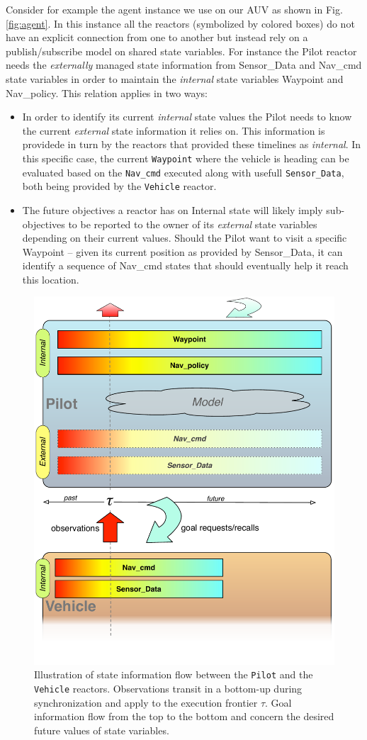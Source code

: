 Consider for example the \rx agent instance we use on our AUV as shown
in Fig. \ref{fig:agent}. In this instance all the reactors (symbolized
by colored boxes) do not have an explicit connection from one to
another but instead rely on a publish/subscribe model on shared state
variables. For instance the \textsf{Pilot} reactor needs the {\em
  externally} managed state information from \textsf{Sensor\_Data} and
\textsf{Nav\_cmd} state variables in order to maintain the
\emph{internal} state variables \textsf{Waypoint} and
\textsf{Nav\_policy}. This relation applies in two ways:

\begin{itemize}

\item In order to identify its current {\em internal} state values the
  \textsf{Pilot} needs to know the current {\em external} state 
  information it relies on. This information is providede in turn by
  the reactors that provided these timelines as {\em internal}. In
  this specific case, the current \texttt{Waypoint} where the vehicle
  is heading can be evaluated based on the \texttt{Nav\_cmd} executed
  along with usefull \texttt{Sensor\_Data}, both being provided by the
  \texttt{Vehicle} reactor.

\item The future objectives a reactor has on \textsf{Internal} state
  will likely imply sub-objectives to be reported to the owner of its
  {\em external} state variables depending on their current
  values. Should the \textsf{Pilot} want to visit a specific
  \textsf{Waypoint} -- given its current position as provided by
  \textsf{Sensor\_Data}, it can identify a sequence of
  \textsf{Nav\_cmd} states that should eventually help it reach this
  location. 

\end{itemize}

\begin{figure}[!htbp]
  \centering
  \includegraphics[width=0.45\columnwidth]{figs/TREX_flow}
  \vskip-1cm
  \caption{Illustration of state information flow between the
    \texttt{Pilot} and the \texttt{Vehicle} reactors.
    Observations transit in a bottom-up during synchronization 
    and apply to the execution frontier $\tau$. 
    Goal information flow from the top to the bottom and concern the
    desired future values of state variables.}
  \label{fig:trex:flow}
\end{figure}


